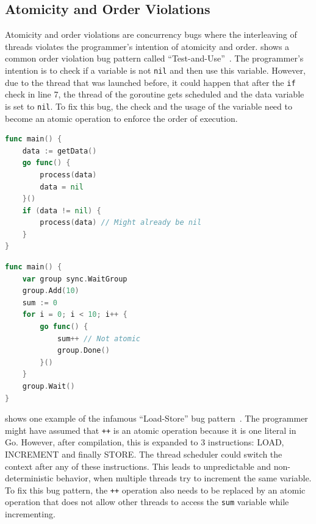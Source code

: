 \documentclass[conference]{IEEEtran}
\begin{document}
\subsection{Atomicity and Order Violations}

Atomicity and order violations are concurrency bugs where the interleaving of threads violates the programmer's intention of atomicity and order.
 shows a common order violation bug pattern called ``Test-and-Use''~\cite{farchi2003patterns}.
The programmer's intention is to check if a variable is not \lstinline{nil} and then use this variable.
However, due to the thread that was launched before, it could happen that after the \lstinline{if} check in line 7, the thread of the goroutine gets scheduled and the data variable is set to \lstinline{nil}.
To fix this bug, the check and the usage of the variable need to become an atomic operation to enforce the order of execution.

\begin{lstlisting}[float=h, language=Go, label=lst:order, caption=Test-and-Use bug pattern -- Order violation]
func main() {
    data := getData()
    go func() {
        process(data)
        data = nil
    }()
    if (data != nil) {
        process(data) // Might already be nil
    }
}
\end{lstlisting}

\begin{lstlisting}[float=h, language=Go, label=lst:atomicity, caption=Load-Store bug pattern -- Atomicity violation]
func main() {
    var group sync.WaitGroup
    group.Add(10)
    sum := 0
    for i = 0; i < 10; i++ {
        go func() {
            sum++ // Not atomic
            group.Done()
        }()
    }
    group.Wait()
}
\end{lstlisting}

 shows one example of the infamous ``Load-Store'' bug pattern~\cite{farchi2003patterns}.
The programmer might have assumed that \lstinline{++} is an atomic operation because it is one literal in Go.
However, after compilation, this is expanded to 3 instructions: LOAD, INCREMENT and finally STORE.
The thread scheduler could switch the context after any of these instructions.
This leads to unpredictable and non-deterministic behavior, when multiple threads try to increment the same variable.
To fix this bug pattern, the \lstinline{++} operation also needs to be replaced by an atomic operation that does not allow other threads to access the \lstinline{sum} variable while incrementing.
\end{document}
